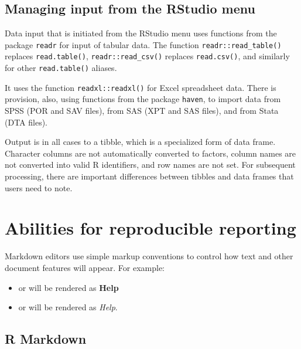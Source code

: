 \subsection{Managing input from the RStudio menu}\label{ss:readEtc}

Data input that is initiated from the RStudio menu uses functions
from the package \texttt{readr} for input of tabular data.
The function \texttt{readr::read\_table()} replaces
\texttt{read.table()}, \texttt{readr::read\_csv()} replaces
\texttt{read.csv()}, and similarly for other \texttt{read.table()}
aliases.

It uses the function \texttt{readxl::readxl()} for Excel
spreadsheet data. There is provision, also, using functions from
the package \texttt{haven}, to import data from SPSS (POR and
SAV files), from SAS (XPT and SAS files), and from Stata (DTA
files).  

Output is in all cases to a tibble, which is a specialized form
of data frame. 
Character columns are not automatically converted to factors,
column names are not converted into valid R identifiers, and row
names are not set.  For subsequent processing, there are
important differences between tibbles and data frames that users
need to note.

\section{Abilities for reproducible reporting}
Markdown editors use simple markup conventions to control how text and
other document features will appear.  For example:
\begin{itemize}
\item[]  or  will be rendered as
\textbf{Help}
\item[]  or  will be rendered as {\em Help}.
\end{itemize}

\subsection{R Markdown}

